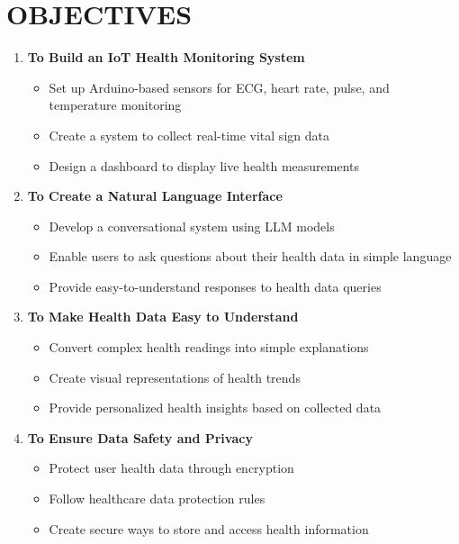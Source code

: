 \section{OBJECTIVES}

\begin{enumerate}
    \item \textbf{To Build an IoT Health Monitoring System}
    \begin{itemize}
        \item Set up Arduino-based sensors for ECG, heart rate, pulse, and temperature monitoring
        \item Create a system to collect real-time vital sign data
        \item Design a dashboard to display live health measurements
    \end{itemize}

    \item \textbf{To Create a Natural Language Interface}
    \begin{itemize}
        \item Develop a conversational system using LLM models
        \item Enable users to ask questions about their health data in simple language
        \item Provide easy-to-understand responses to health data queries
    \end{itemize}

    \item \textbf{To Make Health Data Easy to Understand}
    \begin{itemize}
        \item Convert complex health readings into simple explanations
        \item Create visual representations of health trends
        \item Provide personalized health insights based on collected data
    \end{itemize}

    \item \textbf{To Ensure Data Safety and Privacy}
    \begin{itemize}
        \item Protect user health data through encryption
        \item Follow healthcare data protection rules
        \item Create secure ways to store and access health information
    \end{itemize}
\end{enumerate}